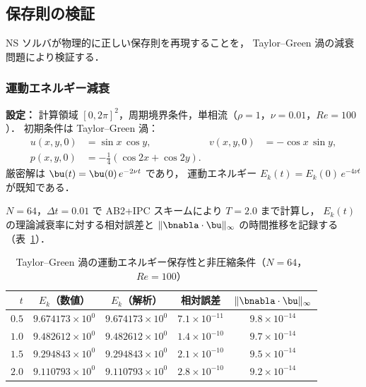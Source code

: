 %
\subsection{保存則の検証}
\label{sec:ns_conservation}

NS ソルバが物理的に正しい保存則を再現することを，
Taylor--Green 渦の減衰問題により検証する．

\subsubsection{運動エネルギー減衰}
\label{sec:energy_conservation}

\textbf{設定：}
計算領域 $[0, 2\pi]^2$，周期境界条件，単相流（$\rho = 1$，$\nu = 0.01$，$\mathit{Re} = 100$）．
初期条件は Taylor--Green 渦：
\begin{align}
  u(x,y,0) &= \sin x\,\cos y, &
  v(x,y,0) &= -\cos x\,\sin y, \\
  p(x,y,0) &= -\tfrac{1}{4}(\cos 2x + \cos 2y).
\end{align}
厳密解は $\bu(t) = \bu(0)\,e^{-2\nu t}$ であり，
運動エネルギー $E_k(t) = E_k(0)\,e^{-4\nu t}$ が既知である．

$N = 64$，$\Delta t = 0.01$ で AB2+IPC スキームにより $T = 2.0$ まで計算し，
$E_k(t)$ の理論減衰率に対する相対誤差と
$\|\bnabla\cdot\bu\|_\infty$ の時間推移を記録する（表~\ref{tab:tgv_energy}）．

\begin{table}[htbp]
\centering
\caption{Taylor--Green 渦の運動エネルギー保存性と非圧縮条件（$N=64$，$\mathit{Re}=100$）}
\label{tab:tgv_energy}
\begin{tabular}{rcccc}
\toprule
$t$ & $E_k$（数値） & $E_k$（解析） & 相対誤差 & $\|\bnabla\cdot\bu\|_\infty$ \\
\midrule
$0.5$ & $9.674173 \times 10^{0}$ & $9.674173 \times 10^{0}$ & $7.1 \times 10^{-11}$ & $9.8 \times 10^{-14}$ \\
$1.0$ & $9.482612 \times 10^{0}$ & $9.482612 \times 10^{0}$ & $1.4 \times 10^{-10}$ & $9.7 \times 10^{-14}$ \\
$1.5$ & $9.294843 \times 10^{0}$ & $9.294843 \times 10^{0}$ & $2.1 \times 10^{-10}$ & $9.5 \times 10^{-14}$ \\
$2.0$ & $9.110793 \times 10^{0}$ & $9.110793 \times 10^{0}$ & $2.8 \times 10^{-10}$ & $9.2 \times 10^{-14}$ \\
\bottomrule
\end{tabular}
\end{table}

